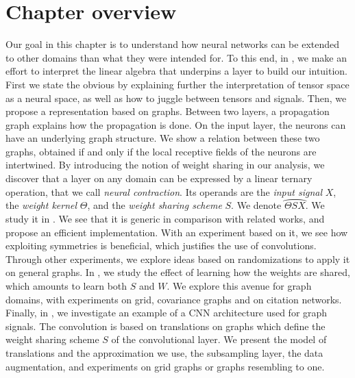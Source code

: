 \section*{Chapter overview}

Our goal in this chapter is to understand how neural networks can be extended to other domains than what they were intended for. To this end, in , we make an effort to interpret the linear algebra that underpins a layer to build our intuition. First we state the obvious by explaining further the interpretation of tensor space as a neural space, as well as how to juggle between tensors and signals. Then, we propose a representation based on graphs. Between two layers, a propagation graph explains how the propagation is done. On the input layer, the neurons can have an underlying graph structure. We show a relation between these two graphs, obtained if and only if the local receptive fields of the neurons are intertwined. By introducing the notion of weight sharing in our analysis, we discover that a layer on any domain can be expressed by a linear ternary operation, that we call \emph{neural contraction}. Its operands are the \emph{input signal} $X$, the \emph{weight kernel} $\Theta$, and the \emph{weight sharing scheme} $S$. We denote $\wideparen{\Theta S X}$. We study it in . We see that it is generic in comparison with related works, and propose an efficient implementation. With an experiment based on it, we see how exploiting symmetries is beneficial, which justifies the use of convolutions. Through other experiments, we explore ideas based on randomizations to apply it on general graphs. In , we study the effect of learning how the weights are shared, which amounts to learn both $S$ and $W$. We explore this avenue for graph domains, with experiments on grid, covariance graphs and on citation networks. Finally, in , we investigate an example of a CNN architecture used for graph signals. The convolution is based on translations on graphs which define the weight sharing scheme $S$ of the convolutional layer. We present the model of translations and the approximation we use, the subsampling layer, the data augmentation, and experiments on grid graphs or graphs resembling to one.
